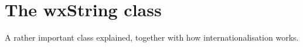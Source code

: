 \chapter{The wxString class}\label{chapstrings}
%
%
\setfooter{\thepage}{}{}{}{}{\thepage}%

A rather important class explained, together with how internationalisation works.

